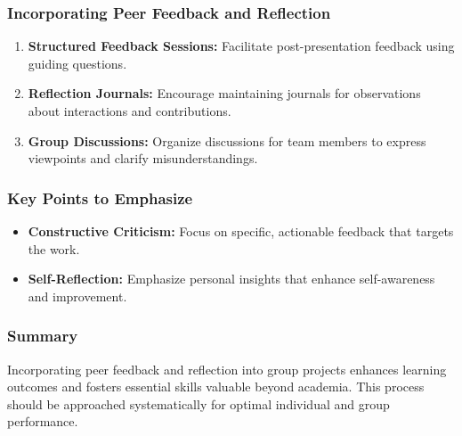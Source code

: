 \documentclass[aspectratio=169]{beamer}
\begin{document}
\begin{frame}[fragile]
    \frametitle{Incorporating Peer Feedback and Reflection}
    \begin{enumerate}
        \item \textbf{Structured Feedback Sessions:} Facilitate post-presentation feedback using guiding questions.
        \item \textbf{Reflection Journals:} Encourage maintaining journals for observations about interactions and contributions.
        \item \textbf{Group Discussions:} Organize discussions for team members to express viewpoints and clarify misunderstandings.
    \end{enumerate}
\end{frame}

\begin{frame}[fragile]
    \frametitle{Key Points to Emphasize}
    \begin{itemize}
        \item \textbf{Constructive Criticism:} Focus on specific, actionable feedback that targets the work.
        \item \textbf{Self-Reflection:} Emphasize personal insights that enhance self-awareness and improvement.
    \end{itemize}
\end{frame}

\begin{frame}[fragile]
    \frametitle{Summary}
    Incorporating peer feedback and reflection into group projects enhances learning outcomes and fosters essential skills valuable beyond academia. This process should be approached systematically for optimal individual and group performance.
\end{frame}
\end{document}
